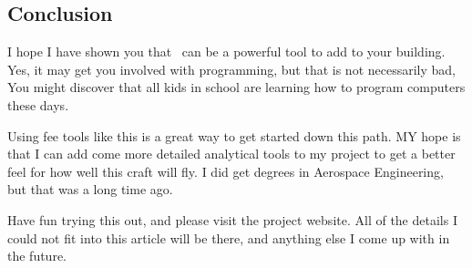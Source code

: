 \subsection{Conclusion}

I hope I have shown you that \osc\ can be a powerful tool to add to your
building. Yes, it may get you involved with programming, but that is not
necessarily bad, You might discover that all kids in school are learning how to
program computers these days.

Using fee tools like this is a great way to get started down this path. MY hope
is that I can add come more detailed analytical tools to my project to get a
better feel for how well this craft will fly. I did get degrees in Aerospace
Engineering, but that was a long time ago. 

Have fun trying this out, and please visit the project website. All of the
details I could not fit into this article will be there, and anything else I
come up with in the future.

